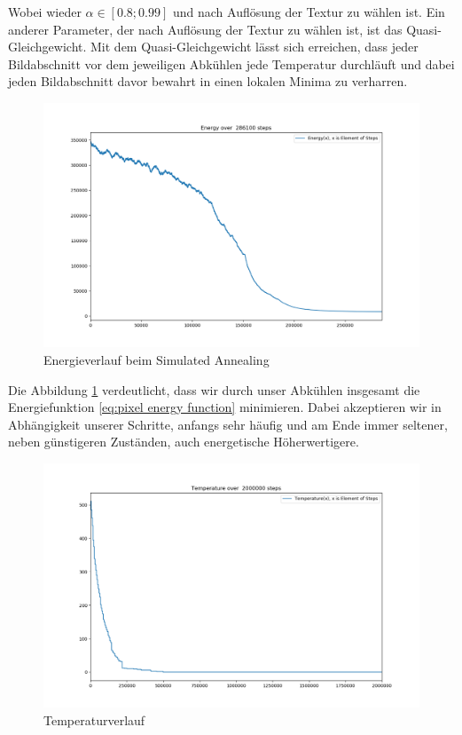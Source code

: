 Wobei wieder $\alpha \in [0.8; 0.99]$ und nach Auflösung der Textur zu wählen ist. Ein anderer Parameter, der nach 
Auflösung der Textur zu wählen ist, ist das Quasi-Gleichgewicht. Mit dem Quasi-Gleichgewicht lässt sich erreichen, 
dass jeder Bildabschnitt vor dem jeweiligen Abkühlen jede Temperatur durchläuft und dabei jeden Bildabschnitt davor 
bewahrt in einen lokalen Minima zu verharren.

\begin{figure}[H]
    \centering
    \includegraphics[width=\linewidth]{content/simulatedAnnealing/Bilder/Energy_286100_steps_KirkpatrickCooldownSchedule.png}
    \caption{Energieverlauf beim Simulated Annealing}
    \label{pic:kirkpatrick energie verlauf}
\end{figure}

Die Abbildung \ref{pic:kirkpatrick energie verlauf} verdeutlicht, dass wir durch unser Abkühlen insgesamt die 
Energiefunktion \ref{eq:pixel energy function} minimieren. Dabei akzeptieren wir in Abhängigkeit unserer Schritte,
anfangs sehr häufig und am Ende immer seltener, neben günstigeren Zuständen, auch energetische Höherwertigere.

\begin{figure}[H]
    \centering
    \includegraphics[width=\linewidth]{content/simulatedAnnealing/Bilder/Temperature.png}
    \caption{Temperaturverlauf}
    \label{pic:Temperaturverlauf kirkpatrick}
\end{figure}

